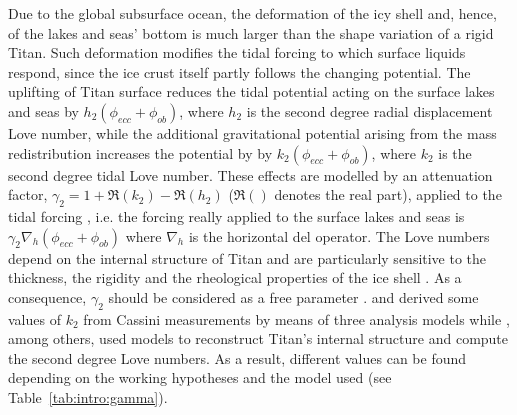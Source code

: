 Due to the global subsurface ocean, the deformation of the icy shell and, hence, of the lakes and seas' bottom is much larger than the shape variation of a rigid Titan. Such deformation modifies the tidal forcing to which surface liquids respond, since the ice crust itself partly follows the changing potential. The uplifting of Titan surface reduces the tidal potential acting on the surface lakes and seas by $h_2\left(\phi_{ecc}+\phi_{ob}\right)$, where $h_2$ is the second degree radial displacement Love number, while the additional gravitational potential arising from the mass redistribution increases the potential by by $k_2\left(\phi_{ecc}+\phi_{ob}\right)$, where $k_2$ is the second degree tidal Love number. These effects are modelled by an attenuation factor, $\gamma_2= 1+\Re(k_2)-\Re(h_2)$ ($\Re()$ denotes the real part), applied to the tidal forcing \citep{lorenz2014radar,tokano2014numerical,beuthe2015tides,beuthe2015tidal}, i.e. the forcing really applied to the surface lakes and seas is $\gamma_2\nabla_h\left(\phi_{ecc}+\phi_{ob}\right)$ where $\nabla_h$ is the horizontal del operator. The Love numbers depend on the internal structure of Titan and are particularly sensitive to the thickness, the rigidity and the rheological properties of the ice shell \citep[e.g.][]{sohl2003interior,lorenz2014radar,tokano2014numerical}. As a consequence, $\gamma_2$ should be considered as a free parameter \citep{lorenz2014radar}. \citet{iess2012tides} and \cite{durante2019titan} derived some values of $k_2$ from Cassini measurements by means of three analysis models while \citet{sohl2003interior, sohl2014structural, baland2014titan, lefevre2014structure,beuthe2015tides, beuthe2015tidal,mitri2014shape}, among others, used models to reconstruct Titan's internal structure and compute the second degree Love numbers. As a result, different values can be found depending on the working hypotheses and the model used (see Table~\ref{tab:intro:gamma}).


